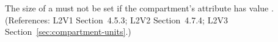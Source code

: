 The size of a \Compartment must not be set if the compartment's
 attribute has value . (References: L2V1
Section~4.5.3; L2V2 Section~4.7.4; L2V3 Section~\ref{sec:compartment-units}.)
